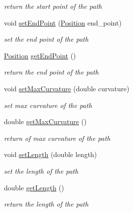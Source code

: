 \begin{DoxyCompactItemize}
\begin{DoxyCompactList}\small\item\em return the start point of the path \end{DoxyCompactList}\item 
void \mbox{\hyperlink{class_path2_d_1_1_path_ae689288570f86c53e4e293ad506c9eb2}{set\+End\+Point}} (\mbox{\hyperlink{class_path2_d_1_1_element_1_1_position}{Position}} end\+\_\+point)
\begin{DoxyCompactList}\small\item\em set the end point of the path \end{DoxyCompactList}\item 
\mbox{\hyperlink{class_path2_d_1_1_element_1_1_position}{Position}} \mbox{\hyperlink{class_path2_d_1_1_path_a66b401fb426001c93d14f4a140834ee2}{get\+End\+Point}} ()
\begin{DoxyCompactList}\small\item\em return the end point of the path \end{DoxyCompactList}\item 
void \mbox{\hyperlink{class_path2_d_1_1_path_a52e9610d2c077a374bdf4d3bf7dd97e0}{set\+Max\+Curvature}} (double curvature)
\begin{DoxyCompactList}\small\item\em set max curvature of the path \end{DoxyCompactList}\item 
double \mbox{\hyperlink{class_path2_d_1_1_path_a250605196731ec8e482dcb31673a6384}{get\+Max\+Curvature}} ()
\begin{DoxyCompactList}\small\item\em return of max curvature of the path \end{DoxyCompactList}\item 
void \mbox{\hyperlink{class_path2_d_1_1_path_aa49a4a999498f68d339e049fcc176776}{set\+Length}} (double length)
\begin{DoxyCompactList}\small\item\em set the length of the path \end{DoxyCompactList}\item 
double \mbox{\hyperlink{class_path2_d_1_1_path_a5460a949ed5a26df41cd81a7884dc144}{get\+Length}} ()
\begin{DoxyCompactList}\small\item\em return the length of the path \end{DoxyCompactList}\item 
\mbox{\label{class_path2_d_1_1_path_a21e3c84c7dc061af4ffdc03df59ff283}} 

\end{DoxyCompactItemize}
